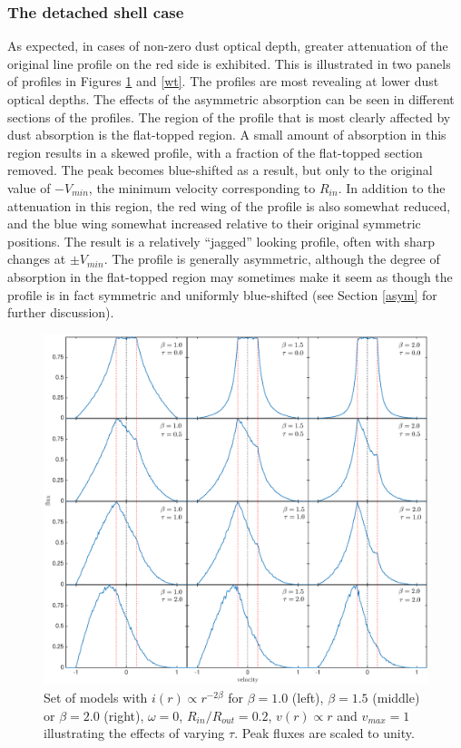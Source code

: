 \subsubsection{The detached shell case}
As expected, in cases of non-zero dust optical depth, greater attenuation of the original line profile on 
the red side is exhibited.  This is illustrated in two panels of profiles in Figures \ref{bt} and \ref{wt}.     The profiles are most revealing at lower 
dust optical depths.  The effects of the asymmetric absorption can be seen in 
different sections of the profiles.  The region of the profile that is 
most clearly affected by dust absorption is the flat-topped region.  A 
small amount of absorption in this region results in a skewed profile, 
with a fraction of the flat-topped section removed.  The peak becomes 
blue-shifted as a result, but only to the original value of $-V_{min}$, the minimum 
velocity corresponding to $R_{in}$. In addition to the attenuation in this region, 
the red wing of the profile is also somewhat reduced, and the blue wing 
somewhat increased relative to their original symmetric positions.  The 
result is a relatively ``jagged'' looking profile, often with sharp changes 
at $\pm V_{min}$.  The profile is generally asymmetric, although the 
degree of absorption in the flat-topped region may sometimes make it seem 
as though the profile is in fact symmetric and uniformly blue-shifted (see 
Section \ref{asym} for further discussion).

\begin{figure}
\includegraphics[trim =87 30 6 15,clip=true,scale=0.45]{chapters/chapter4/images/params/D/newDall}
\caption{Set of models with $i(r) \propto r^{-2\beta}$ for $\beta=1.0$ (left), $\beta=1.5$ (middle) or $\beta=2.0$ (right), $\omega=0$, 
$R_{in}/R_{out}=0.2$, $v(r) \propto r$ and $v_{max}=1$ illustrating the effects of varying 
$\tau$.  Peak fluxes are scaled to unity.}
\label{bt}
\end{figure}


